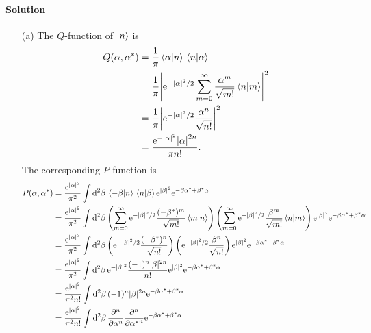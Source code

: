 \documentclass[hyperref, a4paper]{article}
\newcommand*{\ee}{\mathrm{e}}
\begin{document}
\paragraph{Solution}
\begin{itemize}
    \item[(a)] The $Q$-function of $\ket{n}$ is 
    \[
        \begin{aligned}
            Q(\alpha, \alpha^*) &= \frac{1}{\pi} \braket*{\alpha}{n} \braket*{n}{\alpha} \\
            &= \frac{1}{\pi} \abs{ \ee^{-\abs*{\alpha}^2 / 2} \sum_{m=0}^\infty \frac{\alpha^m}{\sqrt{m!}} \braket*{n}{m} }^2 \\
            &= \frac{1}{\pi} \abs{\ee^{-\abs{\alpha}^2/2} \frac{\alpha^n}{\sqrt{n!}}}^2 \\
            &= \frac{\ee^{-\abs{\alpha}^2} \abs{\alpha}^{2n}}{\pi n!}.
        \end{aligned}
    \] 
    The corresponding $P$-function is 
    \[
        \begin{aligned}
            P(\alpha, \alpha^*) &= \frac{\ee^{\left| \alpha \right|^{2}}}{\pi^{2}} \int \dd[2]{\beta} \braket*{-\beta}{n} \braket*{n}{\beta} \ee^{|\beta|^{2}} \ee^{-\beta \alpha^{*}+\beta^{*} \alpha} \\
            &= \frac{\ee^{\left| \alpha \right|^{2}}}{\pi^{2}} \int \dd[2]{\beta} \left( \sum_{m=0}^\infty \ee^{-\abs{\beta}^2/2} \frac{(-\beta^*)^m}{\sqrt{m!}} \braket*{m}{n} \right) \left( \sum_{m=0}^\infty \ee^{-\abs{\beta}^2/2} \frac{\beta^m}{\sqrt{m!}} \braket*{n}{m} \right) \ee^{|\beta|^{2}} \ee^{-\beta \alpha^{*}+\beta^{*} \alpha} \\
            &= \frac{\ee^{\left| \alpha \right|^{2}}}{\pi^{2}} \int \dd[2]{\beta} \left( \ee^{-\abs{\beta}^2/2} \frac{(-\beta^*)^n}{\sqrt{n!}} \right) \left( \ee^{-\abs{\beta}^2/2} \frac{\beta^n}{\sqrt{n!}} \right) \ee^{|\beta|^{2}} \ee^{-\beta \alpha^{*}+\beta^{*} \alpha} \\
            &= \frac{\ee^{\left| \alpha \right|^{2}}}{\pi^{2}} \int \dd[2]{\beta} \ee^{-|\beta|^{2}} \frac{(-1)^{n}|\beta|^{2 n}}{n !}  \ee^{|\beta|^{2}} \ee^{-\beta \alpha^{*}+\beta^{*} \alpha} \\
            &= \frac{\ee^{\left| \alpha \right|^{2}}}{\pi^{2} n !} \int \dd[2]{\beta}  (-1)^{n} |\beta|^{2 n}  \ee^{-\beta \alpha^{*}+\beta^{*} \alpha} \\
            &= \frac{\ee^{\left| \alpha \right|^{2}}}{\pi^{2} n !} \int \dd[2]{\beta}  \pdv[n]{\alpha} \pdv[n]{{\alpha^*}}  \ee^{-\beta \alpha^{*}+\beta^{*} \alpha} \\

\end{aligned}\]
\end{itemize}
\end{document}
